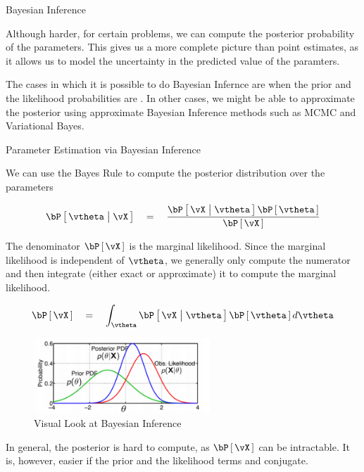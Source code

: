 \documentclass{article}
\begin{document}
\begin{ssection}{Bayesian Inference}

	Although harder, for certain problems, we can compute the posterior probability of the parameters. This gives us a more complete picture than point estimates, as it allows us to model the uncertainty in the predicted value of the paramters. \br

	The cases in which it is possible to do Bayesian Infernce are when the prior and the likelihood probabilities are . In other cases, we might be able to approximate the posterior using approximate Bayesian Inference methods such as MCMC and Variational Bayes. \br

	\begin{ssubsection}{Parameter Estimation via Bayesian Inference}

		We can use the Bayes Rule to compute the posterior distribution over the parameters

		\begin{align*}
			\prob{\vtheta \pipe \vX}	\eq	\frac{\prob{\vX \pipe \vtheta} \prob{\vtheta}}{\prob{\vX}}
		\end{align*}

		The denominator  $\prob{\vX}$ is the marginal likelihood. Since the marginal likelihood is independent of $\vtheta$, we generally only compute the numerator and then integrate (either exact or approximate) it to compute the marginal likelihood.

		\begin{align*}
			\prob{\vX}	\eq	\int_{\vtheta} \prob{\vX \pipe \vtheta} \prob{\vtheta} d \vtheta
		\end{align*}

		\begin{figure}[h!]
			\centering
			\includegraphics[width=250px]{includes/scribe02/bayesian-inference.png}
			\caption{Visual Look at Bayesian Inference}
		\end{figure}

		In general, the posterior is hard to compute, as $\prob{\vX}$ can be intractable. It is, however, easier if the prior and the likelihood terms and conjugate.

	\end{ssubsection}


\end{ssection}
\end{document}
